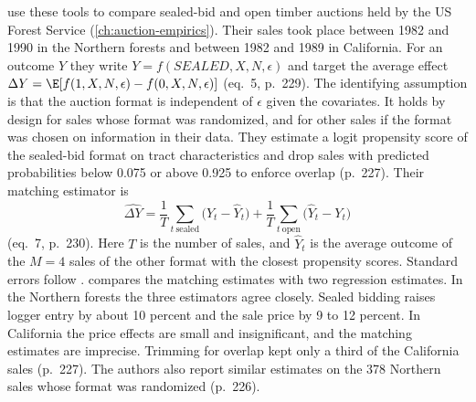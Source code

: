 \citet{AtheyLevinSeira2011} use these tools to compare sealed-bid and open timber auctions held by the US Forest
Service (\cref{ch:auction-empirics}). Their sales took place between 1982 and 1990 in the Northern forests and between
1982 and 1989 in California. For an outcome $Y$ they write $Y=f(\mathit{SEALED},X,N,\epsilon)$
and target the average effect $\Delta Y=\E[f(1,X,N,\epsilon)-f(0,X,N,\epsilon)]$ (eq.~5, p.~229). The identifying
assumption is that the auction format is independent of $\epsilon$ given the covariates. It holds by design for sales
whose format was randomized, and for other sales if the format was chosen on information in their data. They
estimate a logit propensity score of the sealed-bid format on tract characteristics and drop sales with predicted
probabilities below 0.075 or above 0.925 to enforce overlap (p.~227). Their matching estimator is
\begin{equation*}
\widehat{\Delta Y}=\frac{1}{T}\sum_{t\ \text{sealed}}\big(Y_t-\hat Y_t\big)+\frac{1}{T}\sum_{t\ \text{open}}\big(\hat Y_t-Y_t\big)
\end{equation*}
(eq.~7, p.~230). Here $T$ is the number of sales, and $\hat Y_t$ is the average outcome of the $M=4$ sales of the
other format with the closest propensity scores. Standard errors follow \citet{AbadieImbens2006}. 
compares the matching estimates with two regression estimates. In the Northern forests the three estimators agree
closely. Sealed bidding raises logger entry by about 10 percent and the sale price by 9 to 12 percent. In
California the price effects are small and insignificant, and the matching estimates are imprecise. Trimming for
overlap kept only a third of the California sales (p.~227). The authors also report similar estimates on the 378 Northern sales whose format
was randomized (p.~226).

